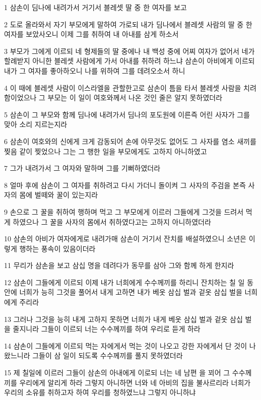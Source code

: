 \par 1 삼손이 딤나에 내려가서 거기서 블레셋 딸 중 한 여자를 보고
\par 2 도로 올라와서 자기 부모에게 말하여 가로되 내가 딤나에서 블레셋 사람의 딸 중 한 여자를 보았사오니 이제 그를 취하여 내 아내를 삼게 하소서
\par 3 부모가 그에게 이르되 네 형제들의 딸 중에나 내 백성 중에 어찌 여자가 없어서 네가 할례받지 아니한 블레셋 사람에게 가서 아내를 취하려 하느냐 삼손이 아비에게 이르되 내가 그 여자를 좋아하오니 나를 위하여 그를 데려오소서 하니
\par 4 이 때에 블레셋 사람이 이스라엘을 관할한고로 삼손이 틈을 타서 블레셋 사람을 치려 함이었으나 그 부모는 이 일이 여호와께서 나온 것인 줄은 알지 못하였더라
\par 5 삼손이 그 부모와 함께 딤나에 내려가서 딤나의 포도원에 이른즉 어린 사자가 그를 맞아 소리 지르는지라
\par 6 삼손이 여호와의 신에게 크게 감동되어 손에 아무것도 없어도 그 사자를 염소 새끼를 찢음 같이 찢었으나 그는 그 행한 일을 부모에게도 고하지 아니하였고
\par 7 그가 내려가서 그 여자와 말하며 그를 기뻐하였더라
\par 8 얼마 후에 삼손이 그 여자를 취하려고 다시 가더니 돌이켜 그 사자의 주검을 본즉 사자의 몸에 벌떼와 꿀이 있는지라
\par 9 손으로 그 꿀을 취하여 행하며 먹고 그 부모에게 이르러 그들에게 그것을 드려서 먹게 하였으나 그 꿀을 사자의 몸에서 취하였다고는 고하지 아니하였더라
\par 10 삼손의 아비가 여자에게로 내려가매 삼손이 거기서 잔치를 배설하였으니 소년은 이렇게 행하는 풍속이 있음이더라
\par 11 무리가 삼손을 보고 삼십 명을 데려다가 동무를 삼아 그와 함께 하게 한지라
\par 12 삼손이 그들에게 이르되 이제 내가 너희에게 수수께끼를 하리니 잔치하는 칠 일 동안에 너희가 능히 그것을 풀어서 내게 고하면 내가 베옷 삼십 벌과 겉옷 삼십 벌을 너희에게 주리라
\par 13 그러나 그것을 능히 내게 고하지 못하면 너희가 내게 베옷 삼십 벌과 겉옷 삼십 벌을 줄지니라 그들이 이르되 너는 수수께끼를 하여 우리로 듣게 하라
\par 14 삼손이 그들에게 이르되 먹는 자에게서 먹는 것이 나오고 강한 자에게서 단 것이 나왔느니라 그들이 삼 일이 되도록 수수께끼를 풀지 못하였더라
\par 15 제 칠일에 이르러 그들이 삼손의 아내에게 이로되 너는 네 남편 을 꾀어 그 수수께끼를 우리에게 알리게 하라 그렇지 아니하면 너와 네 아비의 집을 불사르리라 너희가 우리의 소유를 취하고자 하여 우리를 청하였느냐 그렇지 아니하냐
